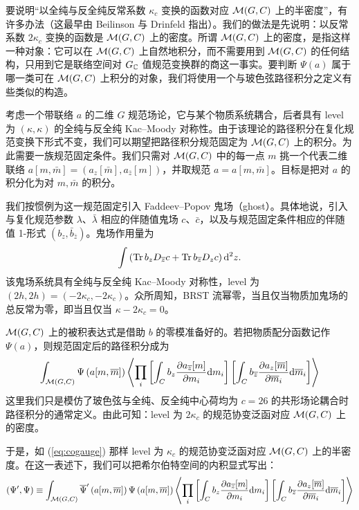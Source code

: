 要说明“以全纯与反全纯反常系数 $\kappa_c$ 变换的函数对应 ${\mathcal M}(G,C)$ 上的半密度”，有许多办法（这最早由 Beilinson 与 Drinfeld \cite{BD} 指出）。我们的做法是先说明：以反常系数 $2\kappa_c$ 变换的函数是 ${\mathcal M}(G,C)$ 上的密度。所谓 ${\mathcal M}(G,C)$ 上的密度，是指这样一种对象：它可以在 ${\mathcal M}(G,C)$ 上自然地积分，而不需要用到 ${\mathcal M}(G,C)$ 的任何结构，只用到它是联络空间对 $G_{\mathbb C}$ 值规范变换群的商这一事实。要判断 $\Psi(a)$ 属于哪一类可在 ${\mathcal M}(G,C)$ 上积分的对象，我们将使用一个与玻色弦路径积分之定义有些类似的构造。

考虑一个带联络 $a$ 的二维 $G$ 规范场论，它与某个物质系统耦合，后者具有 level 为 $(\kappa, \kappa)$ 的全纯与反全纯 Kac–Moody 对称性。由于该理论的路径积分在复化规范变换下形式不变，我们可以期望把路径积分规范固定为 ${\mathcal M}(G,C)$ 上的积分。为此需要一族规范固定条件。我们只需对 ${\mathcal M}(G,C)$ 中的每一点 $m$ 挑一个代表二维联络 $a[m, \bar m] = (a_z[\bar m], a_{\bar z}[m])$，并取规范 $a = a[m, \bar m]$。目标是把对 $a$ 的积分化为对 $m,\bar m$ 的积分。

我们按惯例为这一规范固定引入 Faddeev–Popov 鬼场（ghost）。具体地说，引入与复化规范参数 $\lambda$、$\bar \lambda$ 相应的伴随值鬼场 $c$、$\bar c$，以及与规范固定条件相应的伴随值 1-形式 $(b_z, \bar b_{\bar z})$。鬼场作用量为
\begin{equation}
\int\left( {\rm Tr} \,b_z D_{\overline z} c +  {\rm Tr} \,b_{\overline z} D_z c\right){\mathrm d}^2z.
\end{equation}  
该鬼场系统具有全纯与反全纯 Kac–Moody 对称性，level 为 $(2h,2h)=(-2\kappa_c, -2\kappa_c)$。众所周知，BRST 流幂零，当且仅当物质加鬼场的总反常为零，即当且仅当 $\kappa - 2 \kappa_c=0$。

${\mathcal M}(G,C)$ 上的被积表达式是借助 $b$ 的零模准备好的。若把物质配分函数记作 $\Psi(a)$，则规范固定后的路径积分成为
\begin{equation}
\int_{{\mathcal M}(G,C)} \Psi\left(a[m,\overline m]\right) \left\langle \prod_i \left[\int_C b_z \frac{\partial a_{\overline z}[m]}{\partial m_i} {\mathrm d} m_i \right] \left[\int_C b_{\overline z} \frac{\partial a_{z}[\overline m]}{\partial \overline m_i} {\mathrm d} \overline m_i \right] \right\rangle
\end{equation}   这里我们只是模仿了玻色弦与全纯、反全纯中心荷均为 $c=26$ 的共形场论耦合时路径积分的通常定义。由此可知：level 为 $2 \kappa_c$ 的规范协变泛函对应 ${\mathcal M}(G,C)$ 上的密度。

于是，如 (\ref{eq:cogauge}) 那样 level 为 $\kappa_c$ 的规范协变泛函对应 ${\mathcal M}(G,C)$ 上的半密度。在这一表述下，我们可以把希尔伯特空间的内积显式写出：
\begin{equation}\label{eq:innergauge}
\left( \Psi', \Psi \right) \equiv \int_{{\mathcal M}(G,C)} \overline{\Psi}'\left(a[m,\overline m]\right) \Psi\left(a[m,\overline m]\right) \left\langle \prod_i \left[\int_C b_z \frac{\partial a_{\overline z}[m]}{\partial m_i} {\mathrm d} m_i \right] \left[\int_C b_{\overline z} \frac{\partial a_{z}[\overline m]}{\partial \overline m_i} {\mathrm d} \overline m_i \right] \right\rangle
\end{equation}

